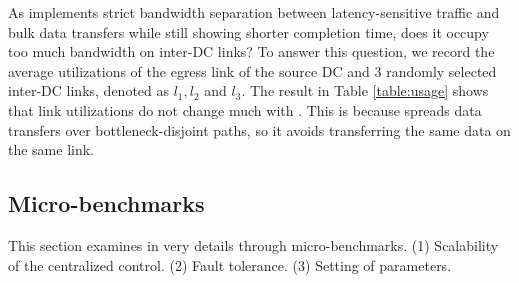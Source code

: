 As \name implements strict bandwidth separation between latency-sensitive traffic and bulk data transfers while still showing shorter completion time, does it occupy too much bandwidth on inter-DC links? To answer this question, we record the average utilizations of the egress link of the source DC and 3 randomly selected inter-DC links, denoted as $l_1,l_2$ and $l_3$. The result in Table \ref{table:usage} shows that link utilizations do not change much with \name. This is because \name spreads data transfers over bottleneck-disjoint paths, so it avoids transferring the same data on the same link.


\subsection{Micro-benchmarks}
\label{subsec:evaluation:benchmarks}

This section examines \name in very details through micro-benchmarks.
(1) Scalability of the centralized control.
(2) Fault tolerance.
(3) Setting of \name parameters.

\label{subsec:evaluation:benchmarks:scalability}

